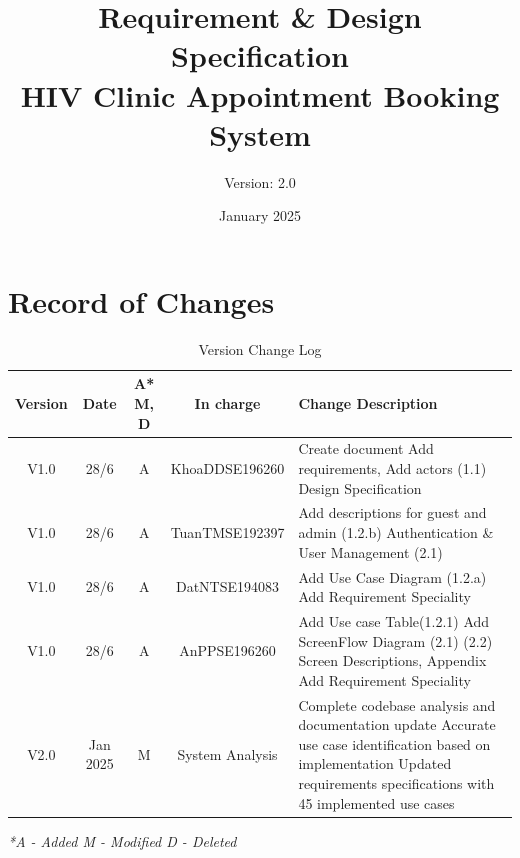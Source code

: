 \documentclass[12pt,a4paper]{article}
\title{\textbf{Requirement \& Design Specification\\HIV Clinic Appointment Booking System}}
\author{Version: 2.0}
\date{January 2025}
\begin{document}
\maketitle
\thispagestyle{empty}

\newpage

\section*{Record of Changes}

\begin{table}[h!]
\centering
\renewcommand{\arraystretch}{1.5}
\begin{tabular}{|c|c|c|c|p{7.5cm}|}
\hline
\textbf{Version} & \textbf{Date} & \textbf{A* M, D} & \textbf{In charge} & \textbf{Change Description} \\
\hline
V1.0 & 28/6 & A & KhoaDDSE196260 & 
Create document \newline
Add requirements, Add actors (1.1) \newline
Design Specification\\
\hline
V1.0 & 28/6 & A & TuanTMSE192397 & 
Add descriptions for guest and admin (1.2.b) \newline
Authentication \& User Management (2.1) \\
\hline
V1.0 & 28/6 & A & DatNTSE194083 & 
Add Use Case Diagram (1.2.a)\newline 
Add Requirement Speciality
\\
\hline
V1.0 & 28/6 & A & AnPPSE196260 & 
Add Use case Table(1.2.1)
Add ScreenFlow Diagram (2.1) \newline
(2.2) Screen Descriptions, Appendix\newline 
Add Requirement Speciality\\
\hline
V2.0 & Jan 2025 & M & System Analysis & 
Complete codebase analysis and documentation update \newline
Accurate use case identification based on implementation \newline
Updated requirements specifications with 45 implemented use cases \\
\hline
\end{tabular}
\caption{Version Change Log}
\label{tab:version-log}
\end{table}

\textit{*A - Added M - Modified D - Deleted}

\newpage

\tableofcontents

\newpage
\end{document}

